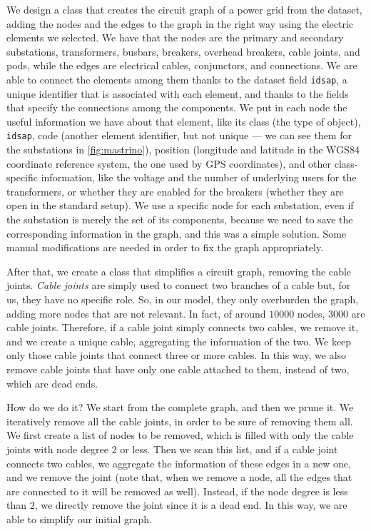We design a class that creates the circuit graph of a power grid from the dataset, adding the nodes and the edges to the graph in the right way using the electric elements we selected. We have that the nodes are the primary and secondary substations, transformers, busbars, breakers, overhead breakers, cable joints, and \acrshort{pod}s, while the edges are electrical cables, conjunctors, and connections. We are able to connect the elements among them thanks to the dataset field \texttt{idsap}, a unique identifier that is associated with each element, and thanks to the fields that specify the connections among the components. We put in each node the useful information we have about that element, like its class (the type of object), \texttt{idsap}, code (another element identifier, but not unique --- we can see them for the substations in \autoref{fig:mastrino}), position (longitude and latitude in the WGS84 coordinate reference system, the one used by GPS coordinates), and other class-specific information, like the voltage and the number of underlying users for the transformers, or whether they are enabled for the breakers (whether they are open in the standard setup). We use a specific node for each substation, even if the substation is merely the set of its components, because we need to save the corresponding information in the graph, and this was a simple solution. Some manual modifications are needed in order to fix the graph appropriately.

After that, we create a class that simplifies a circuit graph, removing the cable joints. \emph{Cable joints} are simply used to connect two branches of a cable but, for us, they have no specific role. So, in our model, they only overburden the graph, adding more nodes that are not relevant. In fact, of around $10000$ nodes, $3000$ are cable joints. Therefore, if a cable joint simply connects two cables, we remove it, and we create a unique cable, aggregating the information of the two. We keep only those cable joints that connect three or more cables. In this way, we also remove cable joints that have only one cable attached to them, instead of two, which are dead ends.

How do we do it? We start from the complete graph, and then we prune it. We iteratively remove all the cable joints, in order to be sure of removing them all. We first create a list of nodes to be removed, which is filled with only the cable joints with node degree $2$ or less. Then we scan this list, and if a cable joint connects two cables, we aggregate the information of these edges in a new one, and we remove the joint (note that, when we remove a node, all the edges that are connected to it will be removed as well). Instead, if the node degree is less than $2$, we directly remove the joint since it is a dead end. In this way, we are able to simplify our initial graph.


